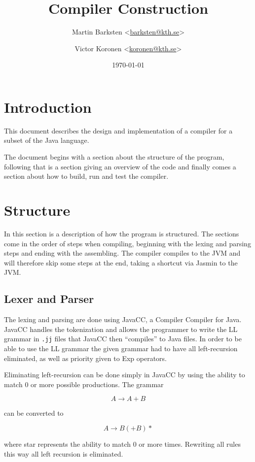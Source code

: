\documentclass[a4paper]{article}
\title{Compiler Construction}
\author{%
    Martin Barksten <\href{mailto:barksten@kth.se}{barksten@kth.se}> \and
    Victor Koronen <\href{mailto:koronen@kth.se}{koronen@kth.se}>
}
\date{\today}
\begin{document}
\maketitle
\thispagestyle{empty}

\section{Introduction}

This document describes the design and implementation of a compiler for a subset
of the Java language.

The document begins with a section about the structure of the program, following
that is a section giving an overview of the code and finally comes a section
about how to build, run and test the compiler.

\section{Structure}

In this section is a description of how the program is structured. The sections
come in the order of steps when compiling, beginning with the lexing and parsing
steps and ending with the assembling. The compiler compiles to the JVM and will
therefore skip some steps at the end, taking a shortcut via Jasmin to the JVM.

\subsection{Lexer and Parser}

The lexing and parsing are done using JavaCC, a Compiler Compiler for Java.
JavaCC handles the tokenization and allows the programmer to write the LL
grammar in \texttt{.jj} files that JavaCC then ``compiles'' to Java files. In
order to be able to use the LL grammar the given grammar had to have all
left-recursion eliminated, as well as priority given to Exp operators.

Eliminating left-recursion can be done simply in JavaCC by using the ability to
match $0$ or more possible productions. The grammar

$$A \rightarrow A + B$$

can be converted to

$$A \rightarrow B (+ B)*$$

where star represents the ability to match $0$ or more times. Rewriting all
rules this way all left recursion is eliminated.
\end{document}
